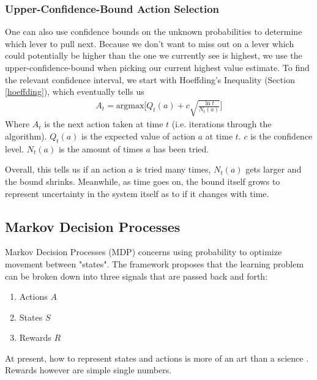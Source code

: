 \subsubsection{Upper-Confidence-Bound Action Selection}

One can also use confidence bounds on the unknown probabilities to determine which lever to pull next. Because we don't want to miss out on a lever which could potentially be higher than the one we currently see is highest, we use the upper-confidence-bound when picking our current highest value estimate. To find the relevant confidence interval, we start with Hoeffding's Inequality (Section \ref{hoeffding}), which eventually tells us
\begin{align}
	A_t = \textrm{argmax}\Big[Q_t(a) + c\sqrt{\frac{\ln t}{N_t(a)}}\Big]
\end{align}
Where $A_t$ is the next action taken at time $t$ (i.e. iterations through the algorithm). $Q_t(a)$ is the expected value of action $a$ at time $t$. $c$ is the confidence level. $N_t(a)$ is the amount of times $a$ has been tried.

Overall, this tells us if an action $a$ is tried many times, $N_t(a)$ gets larger and the bound shrinks. Meanwhile, as time goes on, the bound itself grows to represent uncertainty in the system itself as to if it changes with time.


\subsection{Markov Decision Processes}
Markov Decision Processes (MDP) concerns using probability to optimize movement between "states". The framework proposes that the learning problem can be broken down into three signals that are passed back and forth: 
\begin{enumerate}
	\item Actions $A$
	\item States $S$
	\item Rewards $R$
\end{enumerate}
At present, how to represent states and actions is more of an art than a science \cite{sutton}. Rewards however are simple single numbers.
